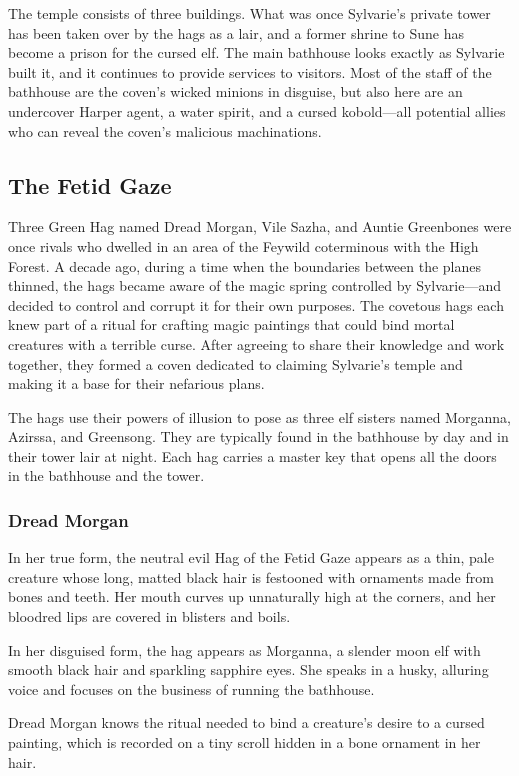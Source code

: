 \documentclass[10pt,a4paper,twoside,bg=print,twocolumn,openany,nodeprecatedcode]{dndbook}
\begin{document}
The temple consists of three buildings. What was once Sylvarie's private tower has been taken over by the hags as a lair, and a former shrine to Sune has become a prison for the cursed elf. The main bathhouse looks exactly as Sylvarie built it, and it continues to provide services to visitors. Most of the staff of the bathhouse are the coven's wicked minions in disguise, but also here are an undercover Harper agent, a water spirit, and a cursed kobold—all potential allies who can reveal the coven's malicious machinations.

\subsection{The Fetid Gaze}
Three Green Hag named Dread Morgan, Vile Sazha, and Auntie Greenbones were once rivals who dwelled in an area of the Feywild coterminous with the High Forest. A decade ago, during a time when the boundaries between the planes thinned, the hags became aware of the magic spring controlled by Sylvarie—and decided to control and corrupt it for their own purposes. The covetous hags each knew part of a ritual for crafting magic paintings that could bind mortal creatures with a terrible curse. After agreeing to share their knowledge and work together, they formed a coven dedicated to claiming Sylvarie's temple and making it a base for their nefarious plans.

The hags use their powers of illusion to pose as three elf sisters named Morganna, Azirssa, and Greensong. They are typically found in the bathhouse by day and in their tower lair at night. Each hag carries a master key that opens all the doors in the bathhouse and the tower.

\subsubsection{Dread Morgan}
In her true form, the neutral evil Hag of the Fetid Gaze appears as a thin, pale creature whose long, matted black hair is festooned with ornaments made from bones and teeth. Her mouth curves up unnaturally high at the corners, and her bloodred lips are covered in blisters and boils.

In her disguised form, the hag appears as Morganna, a slender moon elf with smooth black hair and sparkling sapphire eyes. She speaks in a husky, alluring voice and focuses on the business of running the bathhouse.

Dread Morgan knows the ritual needed to bind a creature's desire to a cursed painting, which is recorded on a tiny scroll hidden in a bone ornament in her hair.
\end{document}
